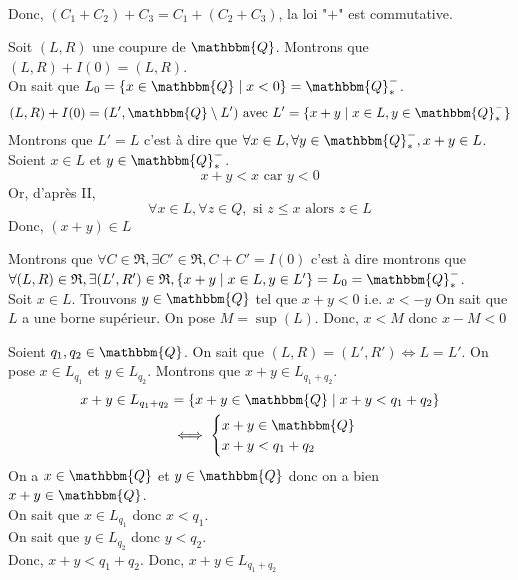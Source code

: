 \documentclass[a4paper]{report}
\let\le\leqslant
\newcommand{\Q}{\mathbbm{Q}}
\begin{document}
\begin{section}
\begin{subsection}{}
\begin{itemize}
\begin{align*}
					\end{align*}
					Donc, $(C_1+C_2)+C_3 = C_1+(C_2+C_3)$, la loi "$+$" est commutative.
			\end{itemize}
		\end{subsection}
		\begin{subsection}{}
			Soit $(L,R)$ une coupure de $\Q$. Montrons que $(L,R) + I(0) = (L,R)$.\\
			On sait que $L_0 = \{x \in \Q  \mid x < 0\} = \Q^-_*$.
			\[
				(L,R) + I(0) = (L', \Q\setminus L') \text{ avec } L' = \{x + y  \mid x \in L, y \in \Q_*^-\}  \\
			\] Montrons que $L' = L$ c'est à dire que $\forall x \in L, \forall y \in\Q_*^-, x+y \in L$.
			Soient $x \in L$ et $y \in \Q_*^-$.
			\[
			x+y < x \text{ car } y < 0
			\] Or, d'après II, \[
			\forall x \in L, \forall z \in Q, \text{ si } z\le x \text{ alors } z \in L
			\]
			Donc, $(x+y) \in L$

			\reversemarginpar{}

		\end{subsection}
		\begin{subsection}{}
			Montrons que $\forall C \in \mathfrak{R}, \exists C' \in \mathfrak{R}, C + C' = I(0)$ c'est à dire montrons que $\forall (L,R) \in \mathfrak{R}, \exists (L',R') \in \mathfrak{R}, \{x+y \mid x\in L,y\in L'\} = L_0 = \Q_*^-$.\\
			Soit $x \in L$. Trouvons $y \in \Q$ tel que $x + y < 0$ i.e. $x < -y$
			On sait que $L$ a une borne supérieur. On pose $M = \sup(L)$. Donc,  $x < M$ donc $x - M < 0$
		\end{subsection}
		\begin{subsection}{}
			Soient $q_1,q_2\in \Q$. On sait que $(L,R) = (L',R') \iff L = L'$. On pose $x \in L_{q_1}$ et $y \in L_{q_2}$. Montrons que $x + y \in L_{q_1+q_2}$.
			\begin{align*}
				x + y \in L_{q_1+q_2} &= \{x + y \in \Q \mid x + y < q_1+q_2\} \\
				&\iff \begin{cases}
					x+y \in \Q\\
					x+y < q_1+q_2
				\end{cases} \\
			\end{align*} 
			On a $x\in \Q$ et $y \in \Q$ donc on a bien $x + y \in \Q$.\\
			On sait que $x \in L_{q_1}$ donc $x < q_1$.\\
			On sait que $y \in L_{q_2}$ donc $y < q_2$.\\
			Donc, $x+y<q_1+q_2$. Donc, $x+y \in L_{q_1+q_2}$\\
			\fbox{Donc $\forall (q_1,q_2)\in Q^2, I(q_1+q_2)=I(q_1)+I(q_2)$}
		\end{subsection}
	\end{section}
\end{document}
